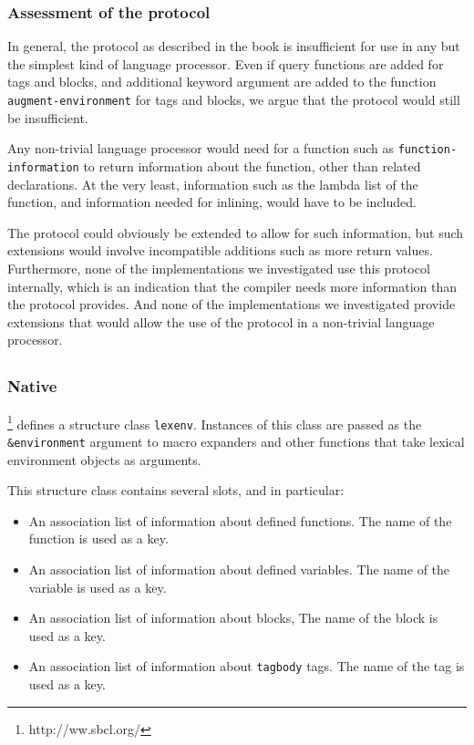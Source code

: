 \subsubsection{Assessment of the protocol}

In general, the protocol as described in the book is insufficient for
use in any but the simplest kind of language processor.  Even if query
functions are added for tags and blocks, and additional keyword
argument are added to the function \texttt{augment-environment} for
tags and blocks, we argue that the protocol would still be
insufficient.

Any non-trivial language processor would need for a function such as
\texttt{function-information} to return information about the
function, other than related declarations.  At the very least,
information such as the lambda list of the function, and information
needed for inlining, would have to be included.

The protocol could obviously be extended to allow for such
information, but such extensions would involve incompatible additions
such as more return values.  Furthermore, none of the \commonlisp{}
implementations we investigated use this protocol internally, which is
an indication that the compiler needs more information than the
protocol provides.  And none of the implementations we investigated
provide extensions that would allow the use of the protocol in
a non-trivial language processor.

\subsection{\sbcl{}}

\subsubsection{Native}

\sbcl{}%
\footnote{http://ww.sbcl.org/}
defines a structure class \texttt{lexenv}.  Instances of
this class are passed as the \texttt{\&environment} argument to macro
expanders and other functions that take lexical environment objects as
arguments.

This structure class contains several slots, and in particular:
\begin{itemize}
\item An association list of information about defined functions.
  The name of the function is used as a key.
\item An association list of information about defined variables.
  The name of the variable is used as a key.
\item An association list of information about blocks,
  The name of the block is used as a key.
\item An association list of information about \texttt{tagbody} tags.
  The name of the tag is used as a key.
\end{itemize}

